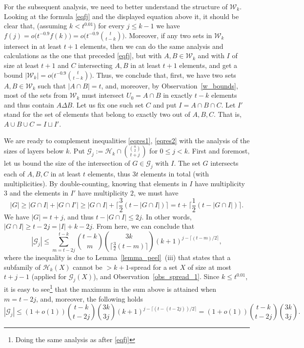 \documentclass[11pt,letterpaper]{amsart}
\renewcommand{\le}{\leqslant}
\renewcommand{\ge}{\geqslant}
\newcommand{\g}{\mathcal{G}}
\newcommand{\h}{\mathcal H}
\newcommand{\W}{\mathcal{W}}
\begin{document}
For the subsequent analysis, we need to better understand the structure of $\W_k$. Looking at the formula \eqref{eqfj} and the displayed equation above it, it should be clear that, (assuming $k<t^{0.01}$) for every $j\le k-1$ we have $f(j)=o\big(t^{-0.9}f(k)\big)= o\big(t^{-0.9}{t\choose t-k}\big)$. Moreover, if any two sets in $\W_k$ intersect in at least $t+1$ elements, then we can do the same analysis and calculations as the one that preceded \eqref{eqfj}, but with $A,B\in \W_k$ and with $I$ of size at least $t+1$ and $C$ intersecting $A,B$ in at least $t+1$ elements, and get a bound $|\W_k|=o\big(t^{-0.9}{t\choose t-k}\big)$. Thus, we conclude that, first, we have two sets $A,B\in \W_k$ such that $|A\cap B| = t$, and, moreover, by Observation~\ref{w_bounds}, most of the sets from $\W_k$ must intersect $U_0 = A\cap B$ in exactly $t-k$ elements and thus contain $A\Delta B$. 
  Let us fix one such set $C$ and put $I = A\cap B\cap C$. Let $I'$ stand for the set of elements that belong to exactly two out of $A,B,C$. That is, $A\cup B\cup C = I\sqcup I'$.

We are ready to complement inequalities \eqref{eqres1}, \eqref{eqres2} with the analysis of the sizes of layers below $k$. Put $\g_j:=\h_k\cap {{n \choose 2}\choose t+j}$ for $0\le j<k$.
First and foremost, let us bound the size of the intersection of $G\in \g_j$ with $I$. The set $G$ intersects each of $A,B,C$ in at least $t$ elements, thus $3t$ elements in total (with multiplicities). By double-counting, knowing that elements in $I$ have multiplicity $3$ and the elements in $I'$ have multiplicity $2$, we must have
$$|G|\ge |G\cap I|+|G\cap I'|\ge |G\cap I|+\Big\lceil\frac 32 (t-|G\cap I|)\Big\rceil= t+\Big\lceil\frac 12(t-|G\cap I|)\Big\rceil.$$ We have $|G|=t+j$, and  thus $t-|G\cap I|\le 2j$. In other words, $|G\cap I|\ge t-2j = |I|+k-2j$. From here, we can conclude that
$$|\g_j|\le \sum_{m=t-2j}^{t-k}{t-k\choose m}{3k\choose \big\lceil\frac 32 (t-m)\big\rceil}(k+1)^{j-\lceil (t-m)/2\rceil},$$
where the inequality is due to Lemma~\ref{lemma_peel}~(iii) that states that a subfamily of $\h_k(X)$ cannot be  $>k+1$-spread for a set $X$ of size at most $t+j-1$ (applied for $\g_j(X)$), and Observation~\ref{obs_spread_1}. Since $k\le t^{0.01}$, it is easy to see\footnote{Doing the same analysis as after \eqref{eqfj}} that the maximum in the sum above is attained when $m = t-2j$, and, moreover, the following holds
$$|\g_j|\le (1+o(1)){t-k\choose t-2j}{3k\choose 3j}(k+1)^{j-\lceil (t-(t-2j))/2\rceil}= (1+o(1)){t-k\choose t-2j}{3k\choose 3j}.$$
\end{document}

